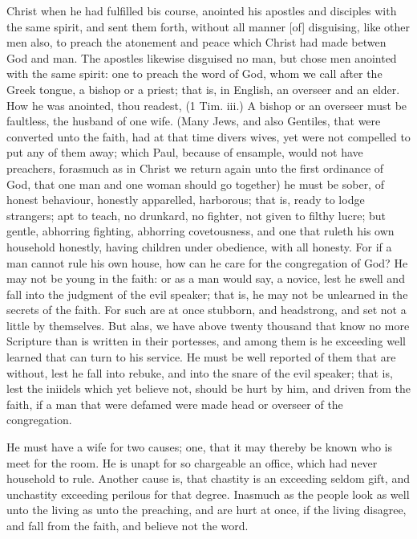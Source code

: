 Christ when he had fulfilled bis course, anointed his 
apostles and disciples with the same spirit, and sent them 
forth, without all manner [of] disguising, like other men 
also, to preach the atonement and peace which Christ had 
made betwen God and man. The apostles likewise disguised
no man, but chose men anointed with the same 
spirit: one to preach the word of God, whom we call 
after the Greek tongue, a bishop or a priest; that is, in 
English, an overseer and an elder. How he was anointed, 
thou readest, (1 Tim. iii.) A bishop or an overseer must 
be faultless, the husband of one wife. (Many Jews, and 
also Gentiles, that were converted unto the faith, had at 
that time divers wives, yet were not compelled to put any 
of them away; which Paul, because of ensample, would 
not have preachers, forasmuch as in Christ we return 
again unto the first ordinance of God, that one man and 
one woman should go together) he must be sober, of 
honest behaviour, honestly apparelled, harborous; that is, 
ready to lodge strangers; apt to teach, no drunkard, 
no fighter, not given to filthy lucre; but gentle, abhorring
fighting, abhorring covetousness, and one that 
ruleth his own household honestly, having children under 
obedience, with all honesty. For if a man cannot rule his 
own house, how can he care for the congregation of God? 
He may not be young in the faith: or as a man would 
say, a novice, lest he swell and fall into the judgment of 
the evil speaker; that is, he may not be unlearned in the 
secrets of the faith. For such are at once stubborn, and 
headstrong, and set not a little by themselves. But alas, 
we have above twenty thousand that know no more Scripture
than is written in their portesses, and among them is 
he exceeding well learned that can turn to his service. 
He must be well reported of them that are without, lest 
he fall into rebuke, and into the snare of the evil speaker; 
that is, lest the iniidels which yet believe not, should be 
hurt by him, and driven from the faith, if a man that were 
defamed were made head or overseer of the congregation. 

He must have a wife for two causes; one, that it may 
thereby be known who is meet for the room. He is unapt 
for so chargeable an office, which had never household to 
rule. Another cause is, that chastity is an exceeding 
seldom gift, and unchastity exceeding perilous for that 
degree. Inasmuch as the people look as well unto the 
living as unto the preaching, and are hurt at once, if the 
living disagree, and fall from the faith, and believe not 
the word. 

